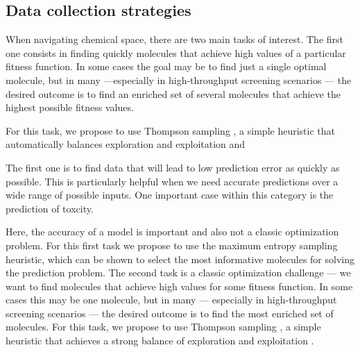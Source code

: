 \subsection{Data collection strategies}

When navigating chemical space, there are two main tasks of interest. The first one consists in finding quickly molecules that achieve high values of a particular fitness function. In some cases the goal may be to find just a single optimal molecule, but in many ---especially in high-throughput screening scenarios \cite{pyzer-knapp_what_2015}--- the desired outcome is to find 
an enriched set of several molecules that achieve the highest possible fitness values.  

For this task, we propose to use Thompson sampling \cite{thompson_likelihood_1933}, a simple heuristic that automatically balances exploration and exploitation \cite{Chapelle2011} and

The first one is to find data that will lead to low prediction error as quickly as possible. This is particularly helpful when we need accurate predictions over a wide range of possible inputs. One important case within this category is the prediction of toxcity. 

Here, the accuracy of a model is important and  also not a classic optimization problem. For this first task we propose to use the maximum entropy sampling heuristic, which can be shown to select the most informative molecules for solving
the prediction problem.  The second task is a classic optimization challenge --- we want to find molecules that achieve high values for some fitness
function.  In some cases this may be one molecule, but in many --- especially in high-throughput screening scenarios \cite{pyzer-knapp_what_2015} --- the
desired outcome is to find the most enriched set of molecules. For this task, we propose to use Thompson sampling \cite{thompson_likelihood_1933}, a simple
heuristic that achieves a strong balance of exploration and exploitation \cite{Chapelle2011}.